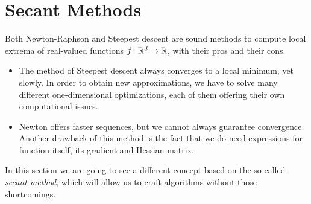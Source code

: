 
\section{Secant Methods}
Both Newton-Raphson and Steepest descent are sound methods to compute local extrema of real-valued functions $f \colon \mathbb{R}^d \to \mathbb{R}$, with their pros and their cons.  
\begin{itemize}
	\item The method of Steepest descent always converges to a local minimum, yet slowly.  In order to obtain new approximations, we have to solve many different one-dimensional optimizations, each of them offering their own computational issues. 
	\item Newton offers faster sequences, but we cannot always guarantee convergence.  Another drawback of this method is the fact that we do need expressions for function itself, its gradient and Hessian matrix.  
\end{itemize}
In this section we are going to see a different concept based on the so-called \emph{secant method}, which will allow us to craft algorithms without those shortcomings.

